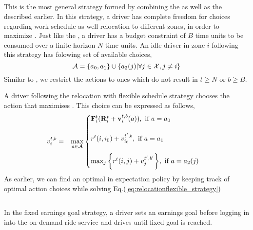 \subsection{\relocationflexible}

This is the most general strategy formed by combining the {\relocation} as well as the {\flexible} described earlier. In this strategy, a driver has complete freedom for choices regarding work schedule as well relocation to different zones, in order to maximize {\totalexpectedearnings}. Just like the {\flexible}, a driver has a budget constraint of $B$ time units to be consumed over a finite horizon $N$ time units. An idle driver in zone $i$ following this strategy has folowing set of available choices,
\begin{equation}
\mathcal{A} =  \{a_0, a_1\} \cup \{a_2(j) | \forall j \in \mathcal{X}, j \neq i \}
\end{equation}
Similar to {\relocation}, we restrict the {\relocate} actions to ones which do not result in $t \geq N$ or $b \geq B$.

A driver following the relocation with flexible schedule strategy chooses the action that maximises {\totalexpectedearnings}. This choice can be expressed as follows,
\begin{eqnarray}
\label{eq:relocationflexible_strategy}
v_{i}^{t,b} &=& \max_{a \in \mathcal{A}}
    \begin{cases}
    {\ensuremath{\mathbf{F}}}_{i}^{t} ({\mathbf{R}}_{i}^{t} +  \mathbf{v}_{i}^{t,b}({a})), \textrm{  if } a = a_0\\ \\
    r^t(i,{i_0}) + v_{{i_0}}^{t',b}, \textrm{  if } a = a_1 \\ \\
    \max_{j} \bigg\{r^t(i,j) + v_{j}^{t',b'}\bigg\}, \textrm{  if } a = a_2(j)
    \end{cases}
\end{eqnarray}
As earlier, we can find an optimal in expectation policy by keeping track of optimal action choices while solving Eq.(\ref{eq:relocationflexible_strategy})

\subsection{\earningsgoal}
In the fixed earnings goal strategy, a driver sets an earnings goal before logging in into the on-demand ride service and drives until fixed goal is reached.
